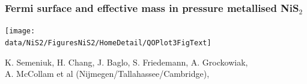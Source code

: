 \begin{frame}[label=NiS2Mass]
  \frametitle{Fermi surface and effective mass in pressure metallised NiS$_2$}
\centerline{\texttt{[image: \\data/NiS2/FiguresNiS2/HomeDetail/QOPlot3FigText]}}
%
%


\vspace*{\fill}
\centerline{\makebox[\linewidth]{\rule{0.85\textwidth}{0.4pt}}}
\begin{center}
{\scriptsize K. Semeniuk, H. Chang, J. Baglo, S. Friedemann, A. Grockowiak, \\
A. McCollam et al (Nijmegen/Tallahassee/Cambridge),  }
\end{center}

\end{frame}





